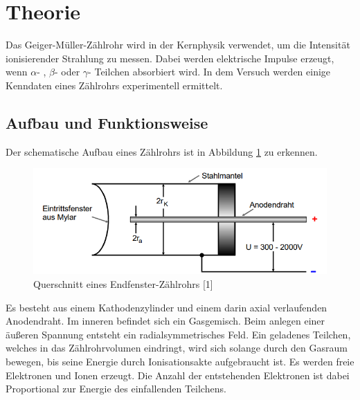 \section{Theorie}
\label{sec:Theorie}
Das Geiger-Müller-Zählrohr wird in der Kernphysik verwendet, um die Intensität ionisierender Strahlung zu messen.
Dabei werden elektrische Impulse erzeugt, wenn $\alpha$- , $\beta$- oder $\gamma$- Teilchen absorbiert wird. In dem Versuch werden
einige Kenndaten eines Zählrohrs experimentell ermittelt.
\subsection{Aufbau und Funktionsweise}
Der schematische Aufbau eines Zählrohrs ist in Abbildung \ref{fig:aufbau} zu erkennen.
\begin{figure}
    \centering
    \includegraphics[scale=0.4]{pics/Aufbau.png}
    \caption{Querschnitt eines Endfenster-Zählrohrs [1]}
    \label{fig:aufbau}
  \end{figure}
Es besteht aus einem Kathodenzylinder und einem darin axial verlaufenden Anodendraht. Im inneren befindet sich ein Gasgemisch.
Beim anlegen einer äußeren Spannung entsteht ein radialsymmetrisches Feld. Ein geladenes Teilchen, welches in das Zählrohrvolumen eindringt,
wird sich solange durch den Gasraum bewegen, bis seine Energie durch Ionisationsakte aufgebraucht ist. 
Es werden freie Elektronen und Ionen erzeugt. Die Anzahl der entstehenden Elektronen ist dabei Proportional zur Energie des einfallenden Teilchens.

